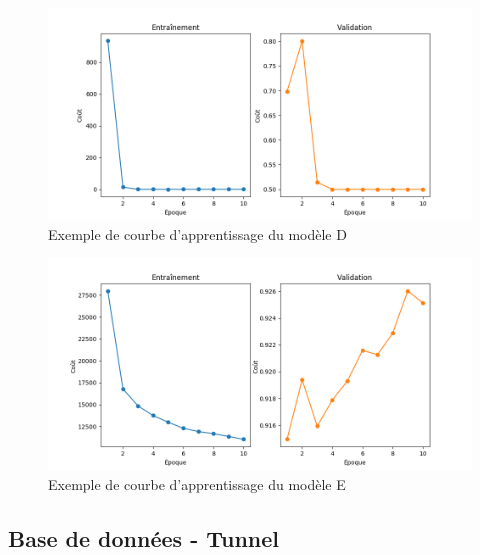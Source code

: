     \begin{figure}[H]
        \centering
        \includegraphics[width=16cm]{images/learning_curves_d.png}
        \caption{Exemple de courbe d'apprentissage du modèle D}
        \label{fig:learning_curves_d}
    \end{figure}

    \begin{figure}[H]
        \centering
        \includegraphics[width=16cm]{images/learning_curves_e.png}
        \caption{Exemple de courbe d'apprentissage du modèle E}
        \label{fig:learning_curves_e}
    \end{figure}

\subsection{Base de données - Tunnel}

